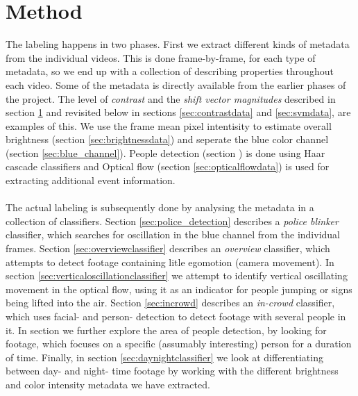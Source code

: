 \section{Method}
%
The labeling happens in two phases. First we extract different kinds of metadata from the individual videos. This is done frame-by-frame, for each type of metadata, so we end up with a collection of describing properties throughout each video. Some of the metadata is directly available from the earlier phases of the project. The level of \textit{contrast} and the \textit{shift vector magnitudes} described in section \ref{} and revisited below in sections \ref{sec:contrastdata} and \ref{sec:svmdata}, are examples of this. We use the frame mean pixel intentisity to estimate overall brightness (section \ref{sec:brightnessdata}) and seperate the blue color channel (section \ref{sec:blue_channel}). People detection (section \label{sec:peopledata}) is done using Haar cascade classifiers and Optical flow (section \ref{sec:opticalflowdata}) is used for extracting additional event information.\\
\\
The actual labeling is subsequently done by analysing the metadata in a collection of classifiers. Section \ref{sec:police_detection} describes a \textit{police blinker} classifier, which searches for oscillation in the blue channel from the individual frames. Section \ref{sec:overviewclassifier} describes an \textit{overview} classifier, which attempts to detect footage containing litle egomotion (camera movement). In section \ref{sec:verticaloscillationclassifier} we attempt to identify vertical oscillating movement in the optical flow, using it as an indicator for people jumping or signs being lifted into the air. Section \ref{sec:incrowd} describes an \textit{in-crowd} classifier, which uses facial- and person- detection to detect footage with several people in it. In section \label{sec:infocus} we further explore the area of people detection, by looking for footage, which focuses on a specific (assumably interesting) person for a duration of time. Finally, in section \ref{sec:daynightclassifier} we look at differentiating between day- and night- time footage by working with the different brightness and color intensity metadata we have extracted.
%
